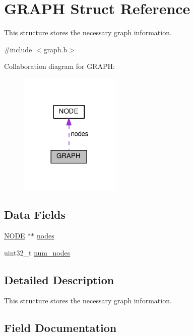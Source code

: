 \hypertarget{structGRAPH}{}\section{G\+R\+A\+PH Struct Reference}
\label{structGRAPH}


This structure stores the necessary graph information.  




{\ttfamily \#include $<$graph.\+h$>$}



Collaboration diagram for G\+R\+A\+PH\+:\nopagebreak
\begin{figure}[H]
\begin{center}
\leavevmode
\includegraphics[width=137pt]{structGRAPH__coll__graph}
\end{center}
\end{figure}
\subsection*{Data Fields}
\begin{DoxyCompactItemize}
\item 
\hyperlink{structNODE}{N\+O\+DE} $\ast$$\ast$ \hyperlink{structGRAPH_adf5e0e2104ad2ebbafe01cd97d4a350d}{nodes}
\item 
uint32\+\_\+t \hyperlink{structGRAPH_aff09b6a0b0bb17a3565cb92bfdff8017}{num\+\_\+nodes}
\end{DoxyCompactItemize}


\subsection{Detailed Description}
This structure stores the necessary graph information. 

\subsection{Field Documentation}
\mbox{\label{structGRAPH_adf5e0e2104ad2ebbafe01cd97d4a350d}} 
